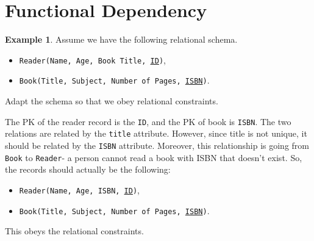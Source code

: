 \documentclass[a4paper, openany]{memoir}
\theoremstyle{definition}
\newtheorem{example}[subsection]{Example}
\begin{document}
    \newpage

    \section{Functional Dependency}
    \begin{example}
        Assume we have the following relational schema.
        \begin{itemize}
            \item \texttt{Reader(Name, Age, Book Title, \underline{ID})},
            \item \texttt{Book(Title, Subject, Number of Pages, \underline{ISBN})}.
        \end{itemize}
        Adapt the schema so that we obey relational constraints.
    \end{example}
    \begin{answer}
        The PK of the reader record is the \texttt{ID}, and the PK of book is \texttt{ISBN}. The two relations are related by the \texttt{title} attribute. However, since title is not unique, it should be related by the \texttt{ISBN} attribute. Moreover, this relationship is going from \texttt{Book} to \texttt{Reader}- a person cannot read a book with ISBN that doesn't exist. So, the records should actually be the following:
        \begin{itemize}
            \item \texttt{Reader(Name, Age, ISBN, \underline{ID})},
            \item \texttt{Book(Title, Subject, Number of Pages, \underline{ISBN})}.
        \end{itemize}
        This obeys the relational constraints.
    \end{answer}
\end{document}
